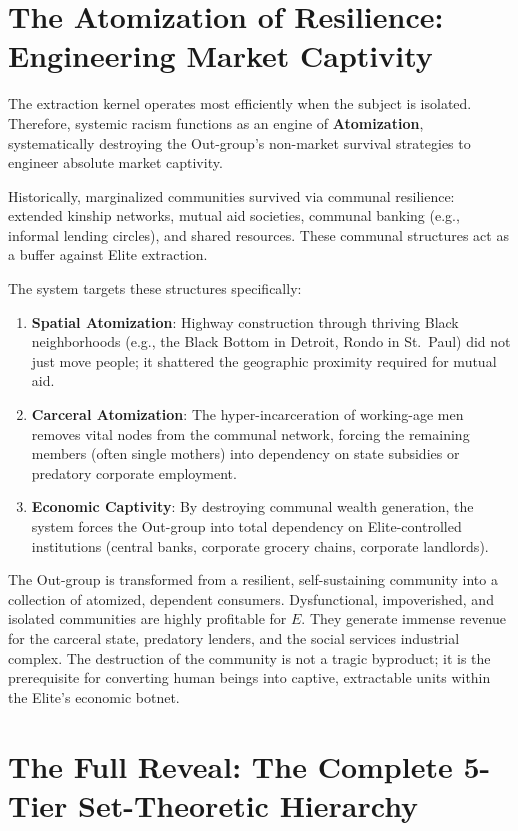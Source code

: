 \documentclass[12pt,openany]{book}
\begin{document}
\section{The Atomization of Resilience: Engineering Market Captivity}

The extraction kernel operates most efficiently when the subject is isolated. Therefore, systemic racism functions as an engine of \textbf{Atomization}, systematically destroying the Out-group's non-market survival strategies to engineer absolute market captivity.

Historically, marginalized communities survived via communal resilience: extended kinship networks, mutual aid societies, communal banking (e.g., informal lending circles), and shared resources. These communal structures act as a buffer against Elite extraction.

The system targets these structures specifically:
\begin{enumerate}
    \item \textbf{Spatial Atomization}: Highway construction through thriving Black neighborhoods (e.g., the Black Bottom in Detroit, Rondo in St.\ Paul) did not just move people; it shattered the geographic proximity required for mutual aid.
    \item \textbf{Carceral Atomization}: The hyper-incarceration of working-age men removes vital nodes from the communal network, forcing the remaining members (often single mothers) into dependency on state subsidies or predatory corporate employment.
    \item \textbf{Economic Captivity}: By destroying communal wealth generation, the system forces the Out-group into total dependency on Elite-controlled institutions (central banks, corporate grocery chains, corporate landlords). 
\end{enumerate}

The Out-group is transformed from a resilient, self-sustaining community into a collection of atomized, dependent consumers. Dysfunctional, impoverished, and isolated communities are highly profitable for $E$. They generate immense revenue for the carceral state, predatory lenders, and the social services industrial complex. The destruction of the community is not a tragic byproduct; it is the prerequisite for converting human beings into captive, extractable units within the Elite's economic botnet.

\section{The Full Reveal: The Complete 5-Tier Set-Theoretic Hierarchy}
\label{sec:full_reveal}
\end{document}
